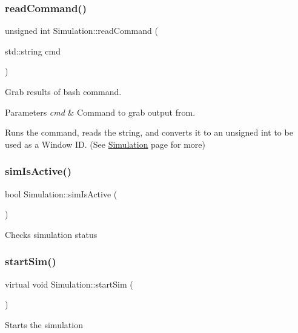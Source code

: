 \subsubsection{\texorpdfstring{readCommand()}{readCommand()}}
{\footnotesize\ttfamily unsigned int Simulation\+::read\+Command (\begin{DoxyParamCaption}\item[{std\+::string}]{cmd }\end{DoxyParamCaption})\hspace{0.3cm}{\ttfamily [inline]}}

Grab results of bash command. 
\begin{DoxyParams}{Parameters}
{\em cmd} & Command to grab output from.\\
\hline
\end{DoxyParams}
Runs the command, reads the string, and converts it to an unsigned int to be used as a Window ID. (See \mbox{\hyperlink{classSimulation}{Simulation}} page for more) \mbox{\label{classSimulation_a0b951a01d3de845823d2a87b0d50adef}} 
\subsubsection{\texorpdfstring{simIsActive()}{simIsActive()}}
{\footnotesize\ttfamily bool Simulation\+::sim\+Is\+Active (\begin{DoxyParamCaption}{ }\end{DoxyParamCaption})\hspace{0.3cm}{\ttfamily [inline]}}

Checks simulation status \mbox{\label{classSimulation_ac523544ffc2b4cffed1d2a6ead5809b1}} 
\subsubsection{\texorpdfstring{startSim()}{startSim()}}
{\footnotesize\ttfamily virtual void Simulation\+::start\+Sim (\begin{DoxyParamCaption}{ }\end{DoxyParamCaption})\hspace{0.3cm}{\ttfamily [pure virtual]}}

Starts the simulation 

